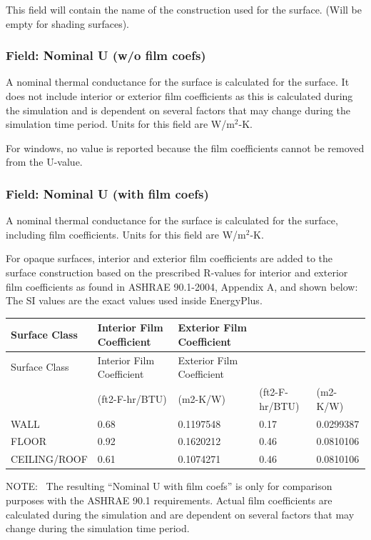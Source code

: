 This field will contain the name of the construction used for the surface. (Will be empty for shading surfaces).

\subsubsection{Field: Nominal U (w/o film coefs)}\label{field-nominal-u-wo-film-coefs}

A nominal thermal conductance for the surface is calculated for the surface. It does not include interior or exterior film coefficients as this is calculated during the simulation and is dependent on several factors that may change during the simulation time period. Units for this field are W/m\(^{2}\)-K.

For windows, no value is reported because the film coefficients cannot be removed from the U-value.

\subsubsection{Field: Nominal U (with film coefs)}\label{field-nominal-u-with-film-coefs}

A nominal thermal conductance for the surface is calculated for the surface, including film coefficients. Units for this field are W/m\(^{2}\)-K.

For opaque surfaces, interior and exterior film coefficients are added to the surface construction based on the prescribed R-values for interior and exterior film coefficients as found in ASHRAE 90.1-2004, Appendix A, and shown below:~ The SI values are the exact values used inside EnergyPlus.

\begin{longtable}[c]{p{1.2in}p{1.2in}p{1.2in}p{1.2in}p{1.2in}}
\toprule 
Surface Class & Interior Film Coefficient & Exterior Film Coefficient \tabularnewline
\midrule
\endfirsthead

\toprule 
Surface Class & Interior Film Coefficient & Exterior Film Coefficient \tabularnewline
\midrule
\endhead

 & (ft2-F-hr/BTU) & (m2-K/W) & (ft2-F-hr/BTU) & (m2-K/W) \tabularnewline
WALL & 0.68 & 0.1197548 & 0.17 & 0.0299387 \tabularnewline
FLOOR & 0.92 & 0.1620212 & 0.46 & 0.0810106 \tabularnewline
CEILING/ROOF & 0.61 & 0.1074271 & 0.46 & 0.0810106 \tabularnewline
\bottomrule
\end{longtable}

NOTE:~ The resulting ``Nominal U with film coefs'' is only for comparison purposes with the ASHRAE 90.1 requirements. Actual film coefficients are calculated during the simulation and are dependent on several factors that may change during the simulation time period.

